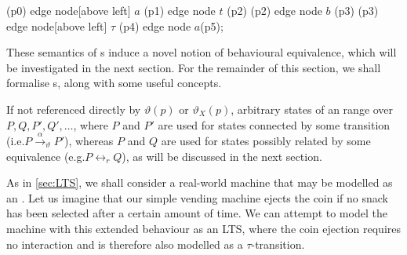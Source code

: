 \begin{isabellebody}
\begin{isamarkuptext}
{{    \path   (p0) edge node[above left]  {$a$}   (p1)
                 edge node              {$t$}   (p2)
            (p2) edge node              {$b$}   (p3)
            (p3) edge node[above left]  {$\tau$}   (p4)
                 edge node              {$a$}(p5);
}}

These semantics of \LTSt{}s induce a novel notion of behavioural equivalence, which will be investigated in the next section. For the remainder of this section, we shall formalise \LTSt{}s, along with some useful concepts.%
\end{isamarkuptext}\isamarkuptrue%
%
\isadelimdocument
%
\endisadelimdocument
%
\isatagdocument
%
\isamarkuptrue%
%
\endisatagdocument
{\isafolddocument}%
%
\isadelimdocument
%
\endisadelimdocument
%
\begin{isamarkuptext}%
If not referenced directly by $\vartheta(p)$ or $\vartheta_X(p)$, arbitrary states of an \LTSt{} range over $P, Q, P', Q', \dots$, where $P$ and $P'$ are used for states connected by some transition (i.e.\@ $P \xrightarrow{\alpha}_\vartheta P'$), whereas $P$ and $Q$ are used for states possibly related by some equivalence (e.g.\@ $P \leftrightarrow_r Q$), as will be discussed in the next section.%
\end{isamarkuptext}\isamarkuptrue%
%
\isadelimdocument
%
\endisadelimdocument
%
\isatagdocument
%
\isamarkuptrue%
%
\endisatagdocument
{\isafolddocument}%
%
\isadelimdocument
%
\endisadelimdocument
%
\begin{isamarkuptext}%
As in \cref{sec:LTS}, we shall consider a real-world machine that may be modelled as an \LTSt{}. Let us imagine that our simple vending machine ejects the coin if no snack has been selected after a certain amount of time. We can attempt to model the machine with this extended behaviour as an LTS, where the coin ejection requires no interaction and is therefore also modelled as a $\tau$-transition.

\end{isamarkuptext}
\end{isabellebody}
